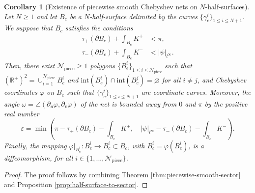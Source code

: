 \documentclass{article}
\newcommand{\R}{\mathbb{R}}
\newcommand{\DU}{\partial_{u}}
\newcommand{\DV}{\partial_{v}}
\newcommand{\halfP}{B}
\newcommand{\psim}{|\psi|_{l^\infty}}
\newcommand{\Npiece}{\mathcal{N}_{\mathrm{piece}}}
\newtheorem{corollaryE}[theorem]{Corollary}
\theoremstyle{remark}
\theoremstyle{prpart}
\begin{document}
\begin{corollaryE}[Existence of piecewise smooth Chebyshev nets on $N$-half-surfaces] \label{cor:cheb-half-surface-smooth2}
  Let $N\geq 1$ and let $\halfP_c$ be a $N$-half-surface delimited by the curves $\{\gamma_c^i\}_{1\leq i\leq N+1}$. We suppose that $\halfP_c$ satisfies the conditions
  \begin{align*}
    \tau_+(\partial \halfP_c) + \int_{\halfP_c} K^+ &< \pi,  \\
    \tau_-(\partial \halfP_c) + \int_{\halfP_c} K^-  &< \psim. 
  \end{align*}
  Then, there exist $\Npiece\geq 1$ polygons $\{\halfP^i_e\}_{1\leq i\leq \Npiece}$ such that $(\R^+)^2 = \cup_{i=1}^{\Npiece}\halfP^i_e$ and $\text{int}(\halfP_e^i)\cap\text{int}(\halfP_e^j)=\varnothing$ for all $i\neq j$, and Chebyshev coordinates $\varphi$ on $\halfP_c$ such that $\{\gamma^i_c\}_{1\leq i\leq N+1}$ are coordinate curves. Moreover, the angle $\omega = \angle(\DU \varphi,\DV \varphi)$ of the net is bounded away from $0$ and $\pi$ by the positive real number
\begin{equation*}
\varepsilon=\min\left(\pi-\tau_+(\partial \halfP_c)-\int_{\halfP_c} K^+,\quad\psim-\tau_-(\partial \halfP_c) - \int_{\halfP_c} K^-\right).
\end{equation*}
Finally, the mapping $\varphi\big|_{\halfP^i_e}:\halfP^i_e\to\halfP^i_c\subset\halfP_c$, with $\halfP^i_c = \varphi(\halfP^i_e)$, is a diffeomorphism, for all $i\in\{1,...,\Npiece\}$.
\end{corollaryE}
\begin{proof}
  The proof follows by combining Theorem \ref{thm:piecewise-smooth-sector} and Proposition \ref{prop:half-surface-to-sector}.
\end{proof}
\end{document}
